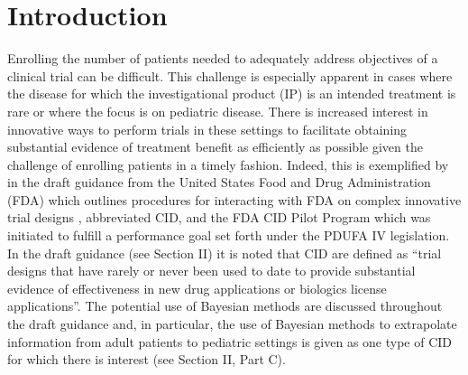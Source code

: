 \documentclass[useAMS,usenatbib,referee]{biom}
\begin{document}
\maketitle


%

\section{Introduction}
Enrolling the number of patients needed to adequately address objectives of a clinical trial can be difficult.
% 
This challenge is especially apparent in cases where the disease for which the investigational product (IP) is an 
intended treatment is rare or where the focus is on pediatric disease.
%
There is increased interest in innovative ways to perform trials in these settings to facilitate obtaining substantial
evidence of treatment benefit as efficiently as possible given the challenge of enrolling patients in a timely fashion.
%
Indeed, this is exemplified by in the draft guidance from the United States Food and Drug Administration (FDA) which outlines
procedures for interacting with FDA on complex innovative trial designs \citep{FDA_CID}, abbreviated CID, and the FDA CID Pilot 
Program which was initiated to fulfill a performance goal set forth under the PDUFA IV legislation.
%
In the draft guidance (see Section II) it is noted that CID are defined as ``trial designs that have rarely or never been used 
to date to provide substantial evidence of effectiveness in new drug applications or biologics license applications''.
%
The potential use of Bayesian methods are discussed throughout the draft guidance and, in particular, the use of Bayesian methods
to extrapolate information from adult patients to pediatric settings is given as one type of CID for which there is interest (see Section 
II, Part C).
\end{document}
